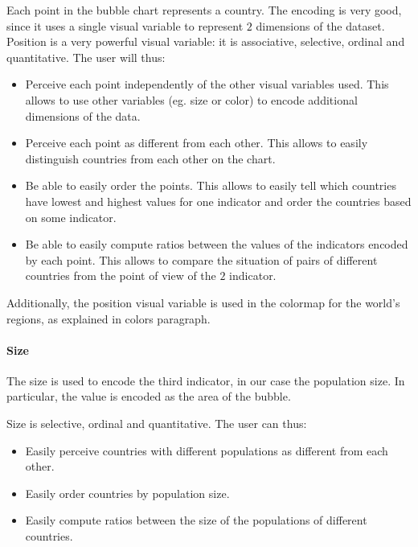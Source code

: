 Each point in the bubble chart represents a country.
The encoding is very good, since it uses a single visual variable to represent $2$ dimensions of the dataset.
Position is a very powerful visual variable: it is associative, selective, ordinal and quantitative.
The user will thus:
\begin{itemize}
    \item Perceive each point independently of the other visual variables used. This allows to use other variables (eg. size or color) to encode additional dimensions of the data.
    \item Perceive each point as different from each other. This allows to easily distinguish countries from each other on the chart.
    \item Be able to easily order the points. This allows to easily tell which countries have lowest and highest values for one indicator and order the countries based on some indicator.
    \item Be able to easily compute ratios between the values of the indicators encoded by each point. This allows to compare the situation of pairs of different countries from the point of view of the $2$ indicator.
\end{itemize}

Additionally, the position visual variable is used in the colormap for the world's regions, as explained in colors paragraph.


\paragraph{Size}
The size is used to encode the third indicator, in our case the population size.
In particular, the value is encoded as the area of the bubble.

Size is selective, ordinal and quantitative.
The user can thus:
\begin{itemize}
    \item Easily perceive countries with different populations as different from each other.
    \item Easily order countries by population size.
    \item Easily compute ratios between the size of the populations of different countries.
\end{itemize}

